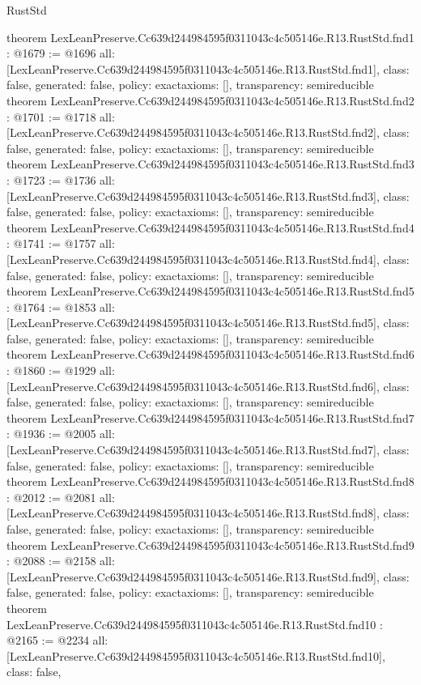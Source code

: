 \begin{lexlean}{RustStd}
\begin{coremodule}
{}
theorem LexLeanPreserve.Cc639d244984595f0311043c4c505146e.R13.RustStd.fnd1 : @1679 := @1696 {
  all: [LexLeanPreserve.Cc639d244984595f0311043c4c505146e.R13.RustStd.fnd1],
  class: false,
  generated: false,
  policy: exact{axioms: []},
  transparency: semireducible
}
theorem LexLeanPreserve.Cc639d244984595f0311043c4c505146e.R13.RustStd.fnd2 : @1701 := @1718 {
  all: [LexLeanPreserve.Cc639d244984595f0311043c4c505146e.R13.RustStd.fnd2],
  class: false,
  generated: false,
  policy: exact{axioms: []},
  transparency: semireducible
}
theorem LexLeanPreserve.Cc639d244984595f0311043c4c505146e.R13.RustStd.fnd3 : @1723 := @1736 {
  all: [LexLeanPreserve.Cc639d244984595f0311043c4c505146e.R13.RustStd.fnd3],
  class: false,
  generated: false,
  policy: exact{axioms: []},
  transparency: semireducible
}
theorem LexLeanPreserve.Cc639d244984595f0311043c4c505146e.R13.RustStd.fnd4 : @1741 := @1757 {
  all: [LexLeanPreserve.Cc639d244984595f0311043c4c505146e.R13.RustStd.fnd4],
  class: false,
  generated: false,
  policy: exact{axioms: []},
  transparency: semireducible
}
theorem LexLeanPreserve.Cc639d244984595f0311043c4c505146e.R13.RustStd.fnd5 : @1764 := @1853 {
  all: [LexLeanPreserve.Cc639d244984595f0311043c4c505146e.R13.RustStd.fnd5],
  class: false,
  generated: false,
  policy: exact{axioms: []},
  transparency: semireducible
}
theorem LexLeanPreserve.Cc639d244984595f0311043c4c505146e.R13.RustStd.fnd6 : @1860 := @1929 {
  all: [LexLeanPreserve.Cc639d244984595f0311043c4c505146e.R13.RustStd.fnd6],
  class: false,
  generated: false,
  policy: exact{axioms: []},
  transparency: semireducible
}
theorem LexLeanPreserve.Cc639d244984595f0311043c4c505146e.R13.RustStd.fnd7 : @1936 := @2005 {
  all: [LexLeanPreserve.Cc639d244984595f0311043c4c505146e.R13.RustStd.fnd7],
  class: false,
  generated: false,
  policy: exact{axioms: []},
  transparency: semireducible
}
theorem LexLeanPreserve.Cc639d244984595f0311043c4c505146e.R13.RustStd.fnd8 : @2012 := @2081 {
  all: [LexLeanPreserve.Cc639d244984595f0311043c4c505146e.R13.RustStd.fnd8],
  class: false,
  generated: false,
  policy: exact{axioms: []},
  transparency: semireducible
}
theorem LexLeanPreserve.Cc639d244984595f0311043c4c505146e.R13.RustStd.fnd9 : @2088 := @2158 {
  all: [LexLeanPreserve.Cc639d244984595f0311043c4c505146e.R13.RustStd.fnd9],
  class: false,
  generated: false,
  policy: exact{axioms: []},
  transparency: semireducible
}
theorem LexLeanPreserve.Cc639d244984595f0311043c4c505146e.R13.RustStd.fnd10 : @2165 := @2234 {
  all: [LexLeanPreserve.Cc639d244984595f0311043c4c505146e.R13.RustStd.fnd10],
  class: false,
}
\end{coremodule}
\end{lexlean}

